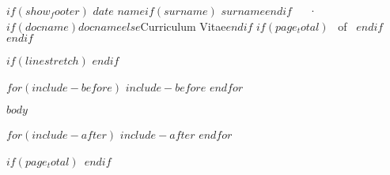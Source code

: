 \documentclass[$if(fontsize)$$fontsize$$else$11pt$endif$,$if(lang)$$babel-lang$,$endif$$if(papersize)$$papersize$$else$a4paper$endif$,$for(classoption)$$classoption$$sep$,$endfor$]{awesome-cv}
\begin{document}
\makecvheader

$if(show_footer)$
\makecvfooter
  {$date$}
    {$name$$if(surname)$ $surname$$endif$~~~·~~~$if(docname)$$docname$$else$Curriculum Vitae$endif$}
  {\thepage$if(page_total)$~ of \pageref{LastPage}~$endif$}
$endif$



$if(linestretch)$
$endif$

$for(include-before)$
$include-before$
$endfor$

$body$

$for(include-after)$
$include-after$
$endfor$

$if(page_total)$\label{LastPage}~$endif$
\end{document}
